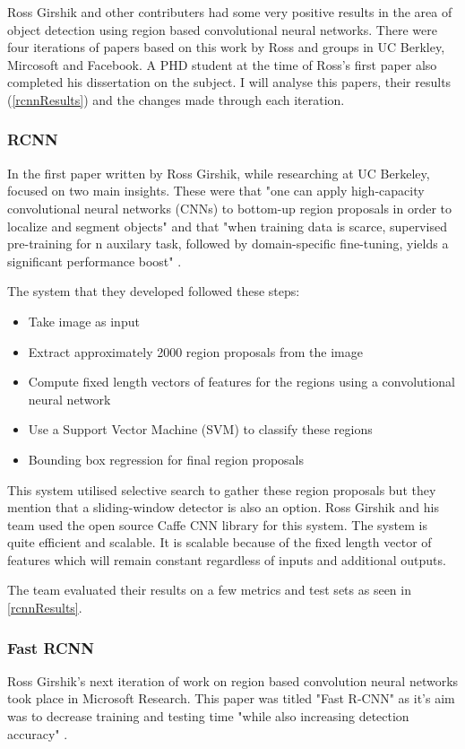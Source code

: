 Ross Girshik and other contributers had some very positive results in the area
of object detection using region based convolutional neural networks. There were
four iterations of papers based on this work by Ross and groups in UC Berkley,
Mircosoft and Facebook. A PHD student at the time of Ross's first paper also
completed his dissertation on the subject. I will analyse this papers, their
results (\ref{rcnnResults}) and the changes made through each iteration.

\subsubsection{RCNN}
In the first paper written by Ross Girshik, while researching at UC Berkeley,
focused on two main insights. These were that "one can apply high-capacity convolutional neural networks (CNNs) to bottom-up region proposals in order to localize and segment objects" and that
"when training data is scarce, supervised pre-training for n auxilary task,
followed by domain-specific fine-tuning, yields a significant performance boost"
\textcite{rcnn}.

The system that they developed followed these steps:
\begin{itemize}
    \item{Take image as input}
    \item{Extract approximately 2000 region proposals from the image}
    \item{Compute fixed length vectors of features for the regions using a convolutional
        neural network}
    \item{Use a Support Vector Machine (SVM) to classify these regions}
    \item{Bounding box regression for final region proposals}
\end{itemize}

This system utilised selective search to gather these region proposals but they
mention that a sliding-window detector is also an option. Ross Girshik and his
team used the open source Caffe CNN library for this system. The system is quite
efficient and scalable. It is scalable because of the fixed length vector of
features which will remain constant regardless of inputs and additional outputs.

The team evaluated their results on a few metrics and test sets as seen in
\ref{rcnnResults}.

\subsubsection{Fast RCNN}
Ross Girshik's next iteration of work on region based convolution neural
networks took place in Microsoft Research. This paper was titled "Fast R-CNN" as
it's aim was to decrease training and testing time "while also increasing
detection accuracy" \textcite{fastRcnn}.

